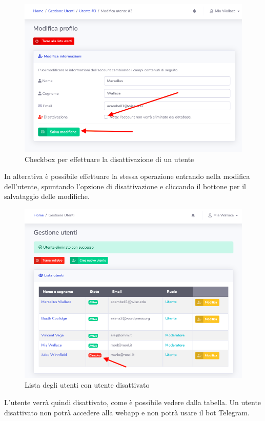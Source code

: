 		\begin{figure}[H]
		\centering
		\includegraphics[scale=0.600]{res/images/mod/disattUtente.png}
		\caption{Checkbox per effettuare la disattivazione di un utente}
	\end{figure}
		In alterativa è possibile effettuare la stessa operazione entrando nella modifica dell'utente, spuntando l'opzione di disattivazione e cliccando il bottone per il salvataggio delle modifiche. 
		\begin{figure}[H]
		\centering
		\includegraphics[scale=0.600]{res/images/mod/utenteDisatt.png}
		\caption{Lista degli utenti con utente disattivato}
	\end{figure}
		L'utente verrà quindi disattivato, come è possibile vedere dalla tabella. Un utente disattivato non potrà accedere alla webapp e non potrà usare il bot Telegram.

